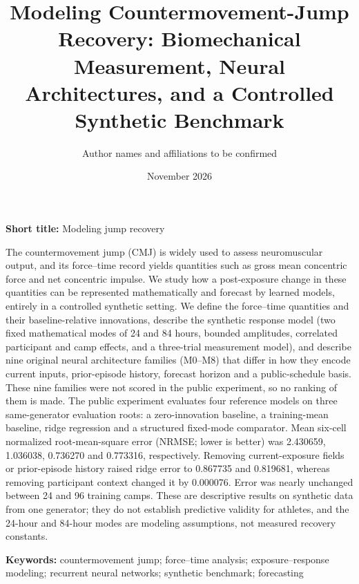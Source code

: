 \documentclass[12pt,a4paper]{article}
\renewenvironment{abstract}{\noindent{\sffamily\bfseries\footnotesize\color{cobalt}ABSTRACT}\par\vspace{2pt}\small\noindent\ignorespaces}{\par}
\begin{document}
\ifdefined\ReviewEdition
  \doublespacing
  \modulolinenumbers[1]
  \linenumbers
\else
\fi

\ifdefined\ReviewEdition
\title{Modeling Countermovement-Jump Recovery: Biomechanical Measurement, Neural Architectures, and a Controlled Synthetic Benchmark}
\author{Author names and affiliations to be confirmed}
\date{November 2026}
\maketitle
\noindent\textbf{Short title:} Modeling jump recovery
\else
\newsavebox{\abstractbox}
\begin{lrbox}{\abstractbox}\begin{minipage}[t]{0.485\textwidth}
\fi
\begin{abstract}
The countermovement jump (CMJ) is widely used to assess neuromuscular output, and its force--time record yields quantities such as gross mean concentric force and net concentric impulse. We study how a post-exposure change in these quantities can be represented mathematically and forecast by learned models, entirely in a controlled synthetic setting. We define the force--time quantities and their baseline-relative innovations, describe the synthetic response model (two fixed mathematical modes of 24 and 84 hours, bounded amplitudes, correlated participant and camp effects, and a three-trial measurement model), and describe nine original neural architecture families (M0--M8) that differ in how they encode current inputs, prior-episode history, forecast horizon and a public-schedule basis. These nine families were not scored in the public experiment, so no ranking of them is made. The public experiment evaluates four reference models on three same-generator evaluation roots: a zero-innovation baseline, a training-mean baseline, ridge regression and a structured fixed-mode comparator. Mean six-cell normalized root-mean-square error (NRMSE; lower is better) was 2.430659, 1.036038, 0.736270 and 0.773316, respectively. Removing current-exposure fields or prior-episode history raised ridge error to 0.867735 and 0.819681, whereas removing participant context changed it by 0.000076. Error was nearly unchanged between 24 and 96 training camps. These are descriptive results on synthetic data from one generator; they do not establish predictive validity for athletes, and the 24-hour and 84-hour modes are modeling assumptions, not measured recovery constants.
\end{abstract}
\ifdefined\ReviewEdition
\noindent\textbf{Keywords:} countermovement jump; force--time analysis; exposure--response modeling; recurrent neural networks; synthetic benchmark; forecasting
\else
\end{minipage}\end{lrbox}
\end{document}
